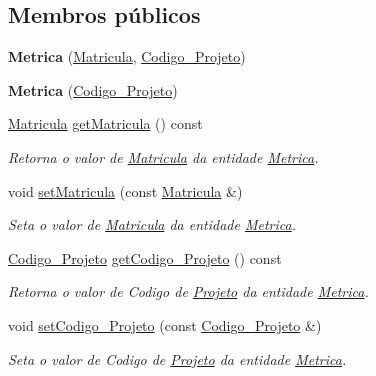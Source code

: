 \subsection*{\-Membros públicos}
\begin{DoxyCompactItemize}
\item 
\hypertarget{class_metrica_ac3f82539f38854ddda63a3026d560079}{
{\bfseries \-Metrica} (\hyperlink{class_matricula}{\-Matricula}, \hyperlink{class_codigo___projeto}{\-Codigo\-\_\-\-Projeto})}
\label{class_metrica_ac3f82539f38854ddda63a3026d560079}

\item 
\hypertarget{class_metrica_a813885cfaa96b5e4bc619ccee47b701f}{
{\bfseries \-Metrica} (\hyperlink{class_codigo___projeto}{\-Codigo\-\_\-\-Projeto})}
\label{class_metrica_a813885cfaa96b5e4bc619ccee47b701f}

\item 
\hyperlink{class_matricula}{\-Matricula} \hyperlink{class_metrica_aac1c9b4d9ce1e9f3f883364d335db398}{get\-Matricula} () const 
\begin{DoxyCompactList}\small\item\em \-Retorna o valor de \hyperlink{class_matricula}{\-Matricula} da entidade \hyperlink{class_metrica}{\-Metrica}. \end{DoxyCompactList}\item 
void \hyperlink{class_metrica_a487bdcdc0e4bf2b5cb2a59eeaee7e573}{set\-Matricula} (const \hyperlink{class_matricula}{\-Matricula} \&)
\begin{DoxyCompactList}\small\item\em \-Seta o valor de \hyperlink{class_matricula}{\-Matricula} da entidade \hyperlink{class_metrica}{\-Metrica}. \end{DoxyCompactList}\item 
\hyperlink{class_codigo___projeto}{\-Codigo\-\_\-\-Projeto} \hyperlink{class_metrica_a07b7984fa372dd071a76eac6b1e4f2ad}{get\-Codigo\-\_\-\-Projeto} () const 
\begin{DoxyCompactList}\small\item\em \-Retorna o valor de \-Codigo de \hyperlink{class_projeto}{\-Projeto} da entidade \hyperlink{class_metrica}{\-Metrica}. \end{DoxyCompactList}\item 
void \hyperlink{class_metrica_a882894975eb6e00d0d076ecb1309ee3f}{set\-Codigo\-\_\-\-Projeto} (const \hyperlink{class_codigo___projeto}{\-Codigo\-\_\-\-Projeto} \&)
\begin{DoxyCompactList}\small\item\em \-Seta o valor de \-Codigo de \hyperlink{class_projeto}{\-Projeto} da entidade \hyperlink{class_metrica}{\-Metrica}. \end{DoxyCompactList}\end{DoxyCompactItemize}


